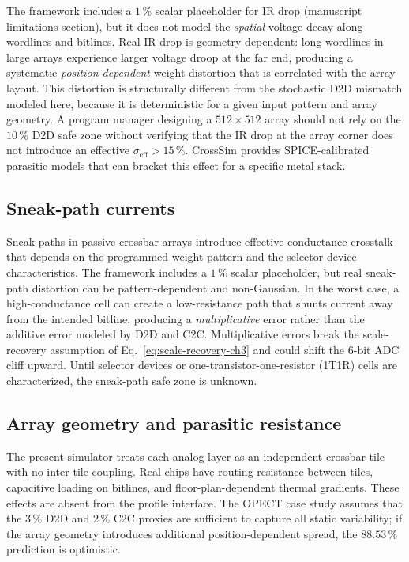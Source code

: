 The framework includes a $1\,\%$ scalar placeholder for IR drop (manuscript limitations section), but it does not model the \emph{spatial} voltage decay along wordlines and bitlines.  Real IR drop is geometry-dependent: long wordlines in large arrays experience larger voltage droop at the far end, producing a systematic \emph{position-dependent} weight distortion that is correlated with the array layout.  This distortion is structurally different from the stochastic D2D mismatch modeled here, because it is deterministic for a given input pattern and array geometry.  A program manager designing a $512 \times 512$ array should not rely on the $10\,\%$ D2D safe zone without verifying that the IR drop at the array corner does not introduce an effective $\sigma_{\mathrm{eff}} > 15\,\%$.  CrossSim \citep{crosssim2026} provides SPICE-calibrated parasitic models that can bracket this effect for a specific metal stack.

\subsection{Sneak-path currents}

Sneak paths in passive crossbar arrays introduce effective conductance crosstalk that depends on the programmed weight pattern and the selector device characteristics.  The framework includes a $1\,\%$ scalar placeholder, but real sneak-path distortion can be pattern-dependent and non-Gaussian.  In the worst case, a high-conductance cell can create a low-resistance path that shunts current away from the intended bitline, producing a \emph{multiplicative} error rather than the additive error modeled by D2D and C2C.  Multiplicative errors break the scale-recovery assumption of Eq.~\ref{eq:scale-recovery-ch3} and could shift the 6-bit ADC cliff upward.  Until selector devices or one-transistor-one-resistor (1T1R) cells are characterized, the sneak-path safe zone is unknown.

\subsection{Array geometry and parasitic resistance}

The present simulator treats each analog layer as an independent crossbar tile with no inter-tile coupling.  Real chips have routing resistance between tiles, capacitive loading on bitlines, and floor-plan-dependent thermal gradients.  These effects are absent from the profile interface.  The OPECT case study assumes that the $3\,\%$ D2D and $2\,\%$ C2C proxies are sufficient to capture all static variability; if the array geometry introduces additional position-dependent spread, the $88.53\,\%$ prediction is optimistic.

